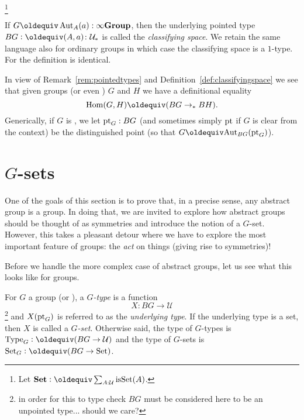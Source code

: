   
\footnote{Let $\typeset\defequi \sum_{A:\mathcal U}\isset(A)$.}
\begin{definition}\label{def:classifyingspace}
  If $G\oldequiv\Aut_A(a):\typeinftygp$, then the underlying pointed type $BG\defequi (A,a)\colon\pttype$ is called the  {\em classifying space}.  We retain the same language also for ordinary groups in which case the classifying space is a $1$-type.   For \inftygps the definition is identical.
\end{definition}
\begin{remark}
  In view of Remark~\ref{rem:pointedtypes} and Definition~\ref{def:classifyingspace} we see that given groups (or even \inftygps) $G$ and $H$ we have a definitional equality
$$\Hom(G,H)\oldequiv(BG\to_*BH).$$
Generically, if $G$ is \aninftygp, we let ${\mathord{\mathrm{pt}}}_G:BG$ (and sometimes simply ${\mathord{\mathrm{pt}}}$ if $G$ is clear from the context) be the distinguished point (so that $G\oldequiv\aut_{BG}(\pt_G)$).
\end{remark}


  


\section{$G$-sets}
\label{sec:gsets}
One of the goals of this section is to prove that, in a precise sense, any abstract group is a group.  In doing that, we are invited to explore how abstract groups should be thought of as symmetries and introduce the notion of a $G$-set.  However, this takes a pleasant detour where we have to explore the most important feature of groups: the {\em act} on things (giving rise to symmetries)!

Before we handle the more complex case of abstract groups, let us see what this looks like for groups.

\begin{definition}
  For $G$ a group (or \inftygp), a {\em $G$-type} is a function 
  $$X\colon BG\to\mathcal U$$\footnote{in order for this to type check $BG$ must be considered here to be an unpointed type... should we care?}
and $X({\mathord{\mathrm{pt}}}_G)$ is referred to as the {\em underlying type}.
If the underlying type is a set, then $X$ is called a {\em $G$-set}.  
Otherwise said, the type of $G$-types is $\Type_G\defequi(BG\to\mathcal U)$ and the type of $G$-sets is $\Set_G\defequi(BG\to\Set)$.
\end{definition}

